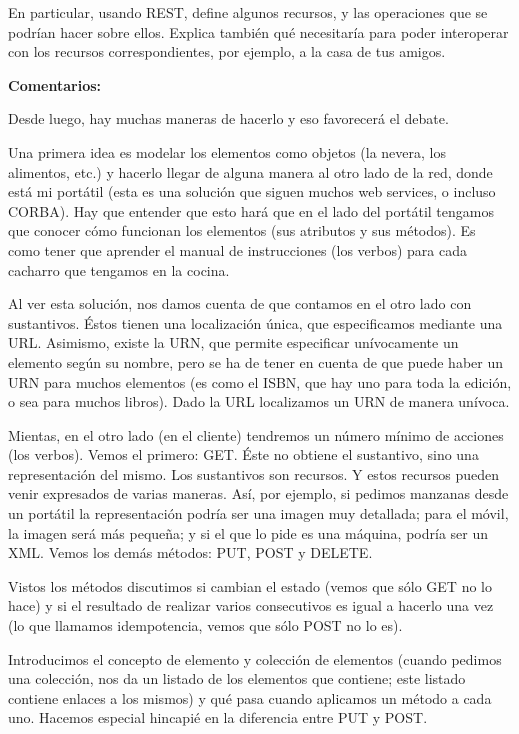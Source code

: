 En particular, usando REST, define algunos recursos, y las operaciones que se podrían hacer sobre ellos. Explica también qué necesitaría para poder interoperar con los recursos correspondientes, por ejemplo, a la casa de tus amigos.

\textbf{Comentarios:}

Desde luego, hay muchas maneras de hacerlo y eso favorecerá el debate.

Una primera idea es modelar los elementos como objetos (la nevera, los alimentos, etc.) y hacerlo llegar de alguna manera al otro lado de la red, donde está mi portátil (esta es una solución que siguen muchos web services, o incluso CORBA). Hay que entender que esto hará que en el lado del portátil tengamos que conocer cómo funcionan los elementos (sus atributos y sus métodos). Es como tener que aprender el manual de instrucciones (los verbos) para cada cacharro que tengamos en la cocina.

Al ver esta solución, nos damos cuenta de que contamos en el otro lado con sustantivos. Éstos tienen una localización única, que especificamos mediante una URL. Asimismo, existe la URN, que permite especificar unívocamente un elemento según su nombre, pero se ha de tener en cuenta de que puede haber un URN para muchos elementos (es como el ISBN, que hay uno para toda la edición, o sea para muchos libros). Dado la URL localizamos un URN de manera unívoca.

Mientas, en el otro lado (en el cliente) tendremos un número mínimo de acciones (los verbos). Vemos el primero: GET. Éste no obtiene el sustantivo, sino una representación del mismo. Los sustantivos son recursos. Y estos recursos pueden venir expresados de varias maneras. Así, por ejemplo, si pedimos manzanas desde un portátil la representación podría ser una imagen muy detallada; para el móvil, la imagen será más pequeña; y si el que lo pide es una máquina, podría ser un XML. Vemos los demás métodos: PUT, POST y DELETE.

Vistos los métodos discutimos si cambian el estado (vemos que sólo GET no lo hace) y si el resultado de realizar varios consecutivos es igual a hacerlo una vez (lo que llamamos idempotencia, vemos que sólo POST no lo es).

Introducimos el concepto de elemento y colección de elementos (cuando pedimos una colección, nos da un listado de los elementos que contiene; este listado contiene enlaces a los mismos) y qué pasa cuando aplicamos un método a cada uno. Hacemos especial hincapié en la diferencia entre PUT y POST.

